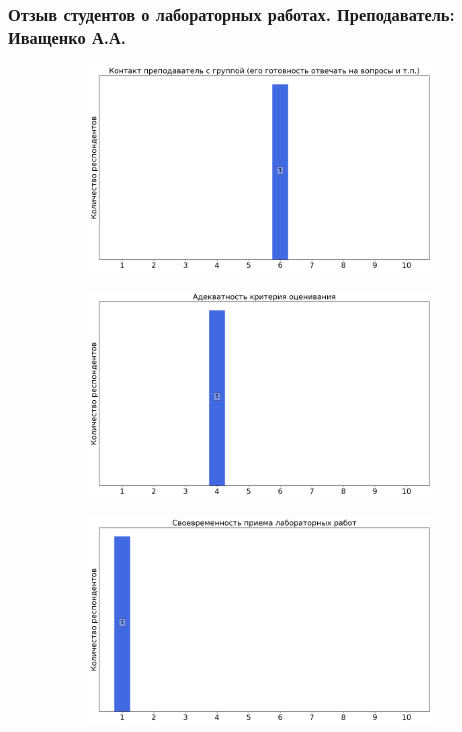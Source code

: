     \subsubsection{Отзыв студентов о лабораторных работах. Преподаватель: Иващенко А.А.}
		\begin{figure}[H]
			\centering
			\begin{subfigure}[b]{0.45\textwidth}
				\centering
				\includegraphics[width=\textwidth]{images/3 course/Аналоговая электроника/labniks-marks-Иващенко А.А.-0.png}
			\end{subfigure}
			\begin{subfigure}[b]{0.45\textwidth}
				\centering
				\includegraphics[width=\textwidth]{images/3 course/Аналоговая электроника/labniks-marks-Иващенко А.А.-1.png}
			\end{subfigure}
			\begin{subfigure}[b]{0.45\textwidth}
				\centering
				\includegraphics[width=\textwidth]{images/3 course/Аналоговая электроника/labniks-marks-Иващенко А.А.-2.png}

\end{subfigure}
\end{figure}
